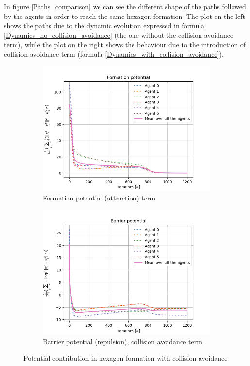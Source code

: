 \documentclass[a4paper,11pt,oneside]{book}
\begin{document}
In figure \ref{Paths_comparison} we can see the different shape of the paths followed by the agents in order to reach the same hexagon formation. The plot on the left shows the paths due to the dynamic evolution expressed in formula \ref{Dynamics_no_collision_avoidance} (the one without the collision avoidance term), while the plot on the right shows the behaviour due to the introduction of collision avoidance term (formula \ref{Dynamics_with_collision_avoidance}).

\begin{figure}[h]
\centering
	\begin{subfigure}{0.49\textwidth}	
	\includegraphics[scale=0.42]{Task-2.2_Formation-p_Yes-Coll-Avoid_Hexagon}
	\caption{Formation potential (attraction) term}
	\end{subfigure}
\hfill
	\begin{subfigure}{0.49\textwidth}	
	\includegraphics[scale=0.42]{Barrier_potential_hexagon_collision}
	\caption{Barrier potential (repulsion), collision avoidance term}
	\end{subfigure}
\caption{Potential contribution in hexagon formation with collision avoidance}
\label{Potentials_with_collision}
\end{figure}
\end{document}
